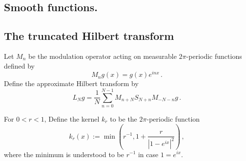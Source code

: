 









\subsection{Smooth functions.}
\label{10smooth}










\subsection{The truncated Hilbert transform}
\label{10hilbert}





Let $M_n$ be the modulation operator
acting on measurable $2\pi$-periodic functions
defined by
\begin{equation}
    M_ng(x)=g(x) e^{inx}\, .
\end{equation}
Define the approximate Hilbert transform by
\begin{equation}
    L_N g=\frac 1N\sum_{n=0}^{N-1}
       M_{n+N} S_{N+n}M_{-N-n}g\, .
\end{equation}










For $0<r<1$, Define the kernel $k_r$ to be the $2\pi$-periodic function
\begin{equation}
    k_r(x):=\min \left(r^{-1}, 1+\frac r{|1-e^{ix}|^2}\right)\, ,
\end{equation}
where the minimum is understood to be $r^{-1}$ in case $1=e^{ix}$.








